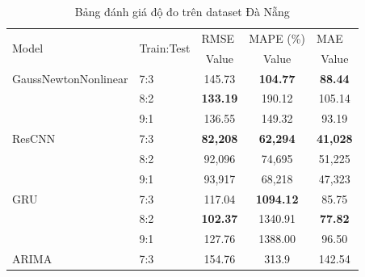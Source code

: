 \documentclass[conference]{IEEEtran}
\begin{document}
\begin{table}[H]
    \centering
    \caption{Bảng đánh giá độ đo trên dataset Đà Nẵng}
    \begin{tabular}{|l|l|c|c|c|}
        \hline
        \multirow{2}{*}{Model} & \multirow{2}{*}{Train:Test} & \multicolumn{1}{l|}{RMSE} & \multicolumn{1}{l|}{MAPE (\%)} & \multicolumn{1}{l|}{MAE} \\ \cline{3-5}
                               &                             & Value                     & Value                          & Value                    \\ \hline
        GaussNewtonNonlinear   & 7:3                         & 145.73                    & \textbf{104.77}                & \textbf{88.44}           \\ \cline{2-5}
                               & 8:2                         & \textbf{133.19}           & 190.12                         & 105.14                   \\ \cline{2-5}
                               & 9:1                         & 136.55                    & 149.32                         & 93.19                    \\ \hline
        ResCNN                 & 7:3                         & \textbf{82,208}           & \textbf{62,294}                & \textbf{41,028}          \\ \cline{2-5}
                               & 8:2                         & 92,096                    & 74,695                         & 51,225                   \\ \cline{2-5}
                               & 9:1                         & 93,917                    & 68,218                         & 47,323                   \\ \hline
        GRU                    & 7:3                         & 117.04                    & \textbf{1094.12}               & 85.75                    \\ \cline{2-5}
                               & 8:2                         & \textbf{102.37}           & 1340.91                        & \textbf{77.82}           \\ \cline{2-5}
                               & 9:1                         & 127.76                    & 1388.00                        & 96.50                    \\ \hline
        ARIMA                  & 7:3                         & 154.76                    & 313.9                          & 142.54                   \\ \cline{2-5}

\end{tabular}
\end{table}
\end{document}
